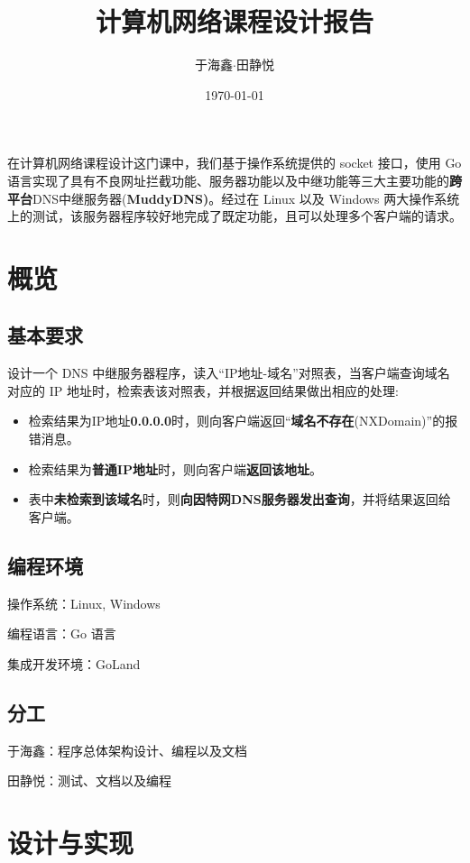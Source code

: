 \documentclass[blue,normal,cn]{elegantnote}
\title{计算机网络课程设计报告}
\date{\today}
\author{于海鑫$\cdot$田静悦}
\begin{document}
\maketitle
在计算机网络课程设计这门课中，我们基于操作系统提供的 socket 接口，使用 Go 语言实现了具有不良网址拦截功能、服务器功能以及中继功能等三大主要功能的\textbf{跨平台}DNS中继服务器(\textbf{MuddyDNS)}。经过在 Linux 以及 Windows 两大操作系统上的测试，该服务器程序较好地完成了既定功能，且可以处理多个客户端的请求。
\section{概览}
\subsection{基本要求}
设计一个 DNS 中继服务器程序，读入``IP地址-域名''对照表，当客户端查询域名对应的 IP 地址时，检索表该对照表，并根据返回结果做出相应的处理:
\begin{itemize}
	\item 检索结果为IP地址\textbf{0.0.0.0}时，则向客户端返回``\textbf{域名不存在}(NXDomain)''的报错消息。
	\item 检索结果为\textbf{普通IP地址}时，则向客户端\textbf{返回该地址}。
	\item 表中\textbf{未检索到该域名}时，则\textbf{向因特网DNS服务器发出查询}，并将结果返回给客户端。
\end{itemize}
\subsection{编程环境}
操作系统：Linux, Windows

编程语言：Go 语言

集成开发环境：GoLand
\subsection{分工}
于海鑫：程序总体架构设计、编程以及文档

田静悦：测试、文档以及编程
\section{设计与实现}
\end{document}
